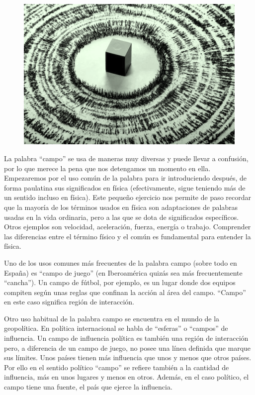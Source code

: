 	\begin{figure}[H]
	\centering
	\includegraphics[width=.75\textwidth]{imagenes/imagenescv/ExperientiaDocet01.png}
	\end{figure}

La palabra “campo” se usa de maneras muy diversas y puede llevar a confusión, por lo que merece la pena que nos detengamos un momento en ella. Empezaremos por el uso común de la palabra para ir introduciendo después, de forma paulatina sus significados en física (efectivamente, sigue teniendo más de un sentido incluso en física). Este pequeño ejercicio nos permite de paso recordar que la mayoría de los términos usados en física son adaptaciones de palabras usadas en la vida ordinaria, pero a las que se dota de significados específicos. Otros ejemplos son velocidad, aceleración, fuerza, energía o trabajo. Comprender las diferencias entre el término físico y el común es fundamental para entender la física.

Uno de los usos comunes más frecuentes de la palabra campo (sobre todo en España) es “campo de juego” (en Iberoamérica quizás sea más frecuentemente “cancha”). Un campo de fútbol, por ejemplo, es un lugar donde dos equipos compiten según unas reglas que confinan la acción al área del campo. “Campo” en este caso significa región de interacción.

Otro uso habitual de la palabra campo se encuentra en el mundo de la geopolítica. En política internacional se habla de “esferas” o “campos” de influencia. Un campo de influencia política es también una región de interacción pero, a diferencia de un campo de juego, no posee una línea definida que marque sus límites. Unos países tienen más influencia que unos y menos que otros países. Por ello en el sentido político “campo” se refiere también a la cantidad de influencia, más en unos lugares y menos en otros. Además, en el caso político, el campo tiene una fuente, el país que ejerce la influencia.

